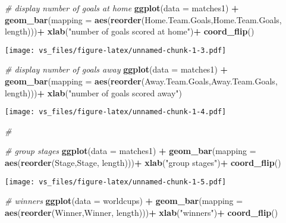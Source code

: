 \documentclass[]{article}
\newenvironment{Shaded}{\begin{snugshade}}{\end{snugshade}}
\newcommand{\KeywordTok}[1]{\textcolor[rgb]{0.13,0.29,0.53}{\textbf{#1}}}
\newcommand{\DataTypeTok}[1]{\textcolor[rgb]{0.13,0.29,0.53}{#1}}
\newcommand{\StringTok}[1]{\textcolor[rgb]{0.31,0.60,0.02}{#1}}
\newcommand{\CommentTok}[1]{\textcolor[rgb]{0.56,0.35,0.01}{\textit{#1}}}
\newcommand{\OperatorTok}[1]{\textcolor[rgb]{0.81,0.36,0.00}{\textbf{#1}}}
\newcommand{\NormalTok}[1]{#1}
\begin{document}
\begin{Shaded}
\begin{Highlighting}[]
\CommentTok{# display number of goals at home}
\KeywordTok{ggplot}\NormalTok{(}\DataTypeTok{data =}\NormalTok{ matches1) }\OperatorTok{+}
\StringTok{  }\KeywordTok{geom_bar}\NormalTok{(}\DataTypeTok{mapping =} \KeywordTok{aes}\NormalTok{(}\KeywordTok{reorder}\NormalTok{(Home.Team.Goals,Home.Team.Goals, length)))}\OperatorTok{+}\StringTok{ }\KeywordTok{xlab}\NormalTok{(}\StringTok{"number of goals scored at home"}\NormalTok{)}\OperatorTok{+}\StringTok{ }\KeywordTok{coord_flip}\NormalTok{()}
\end{Highlighting}
\end{Shaded}

\texttt{[image: vs\_files/figure-latex/unnamed-chunk-1-3.pdf]}

\begin{Shaded}
\begin{Highlighting}[]
\CommentTok{# display number of goals away}
\KeywordTok{ggplot}\NormalTok{(}\DataTypeTok{data =}\NormalTok{ matches1) }\OperatorTok{+}
\StringTok{  }\KeywordTok{geom_bar}\NormalTok{(}\DataTypeTok{mapping =} \KeywordTok{aes}\NormalTok{(}\KeywordTok{reorder}\NormalTok{(Away.Team.Goals,Away.Team.Goals, length)))}\OperatorTok{+}\StringTok{ }\KeywordTok{xlab}\NormalTok{(}\StringTok{"number of goals scored away"}\NormalTok{)}
\end{Highlighting}
\end{Shaded}

\texttt{[image: vs\_files/figure-latex/unnamed-chunk-1-4.pdf]}

\begin{Shaded}
\begin{Highlighting}[]
\CommentTok{#}

\CommentTok{# group stages}
\KeywordTok{ggplot}\NormalTok{(}\DataTypeTok{data =}\NormalTok{ matches1) }\OperatorTok{+}\StringTok{ }\KeywordTok{geom_bar}\NormalTok{(}\DataTypeTok{mapping =} \KeywordTok{aes}\NormalTok{(}\KeywordTok{reorder}\NormalTok{(Stage,Stage, length)))}\OperatorTok{+}\StringTok{ }\KeywordTok{xlab}\NormalTok{(}\StringTok{"group stages"}\NormalTok{)}\OperatorTok{+}\StringTok{ }\KeywordTok{coord_flip}\NormalTok{()}
\end{Highlighting}
\end{Shaded}

\texttt{[image: vs\_files/figure-latex/unnamed-chunk-1-5.pdf]}

\begin{Shaded}
\begin{Highlighting}[]
\CommentTok{# winners}
\KeywordTok{ggplot}\NormalTok{(}\DataTypeTok{data =}\NormalTok{ worldcups) }\OperatorTok{+}\StringTok{ }\KeywordTok{geom_bar}\NormalTok{(}\DataTypeTok{mapping =} \KeywordTok{aes}\NormalTok{(}\KeywordTok{reorder}\NormalTok{(Winner,Winner, length)))}\OperatorTok{+}\StringTok{ }\KeywordTok{xlab}\NormalTok{(}\StringTok{"winners"}\NormalTok{)}\OperatorTok{+}\StringTok{ }\KeywordTok{coord_flip}\NormalTok{()}
\end{Highlighting}
\end{Shaded}
\end{document}
